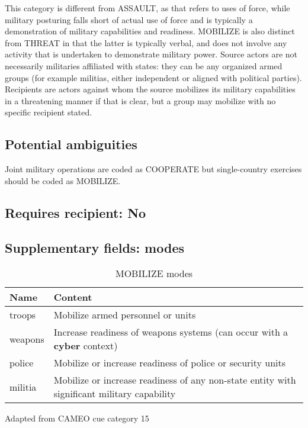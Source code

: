 \documentclass[11pt]{report}
\newcommand{\plcat}[1]{\textsf{#1}}
\newcommand{\plcon}[1]{\textbf{#1}}
\begin{document}
This category is different from \plcat{ASSAULT}, as that refers to uses of force, while military posturing falls short of actual use of force and is typically a demonstration of military capabilities and readiness. \plcat{MOBILIZE} is also distinct from \plcat{THREAT} in that the latter is typically verbal, and does not involve any activity that is undertaken to demonstrate military power. Source actors  are not necessarily militaries affiliated with states: they can be any organized armed groups (for example militias, either independent or aligned with political parties). Recipients are actors against whom the source mobilizes its military capabilities in a threatening manner if that is clear, but a group may mobilize with no specific recipient stated.

\subsection{Potential ambiguities}

Joint military operations are coded as \plcat{COOPERATE} but single-country exercises should be coded as \plcat{MOBILIZE}.

\subsection{Requires recipient: No}

\subsection{Supplementary fields: modes }

\begin{table}[htp]
\caption{MOBILIZE modes}
\begin{center}
\begin{tabular}{|l|p{13cm}|}
\hline
Name & Content \\
\hline
troops & Mobilize armed personnel or units\\
weapons & Increase readiness of weapons systems (can occur with a \plcon{cyber} context) \\
police & Mobilize or increase readiness of police or security units\\
militia & Mobilize or increase readiness of any non-state entity with significant military capability\\
\hline
\end{tabular}
\end{center}
\label{tab:mobilizemode}
Adapted from CAMEO cue category 15
\end{table}
\end{document}
